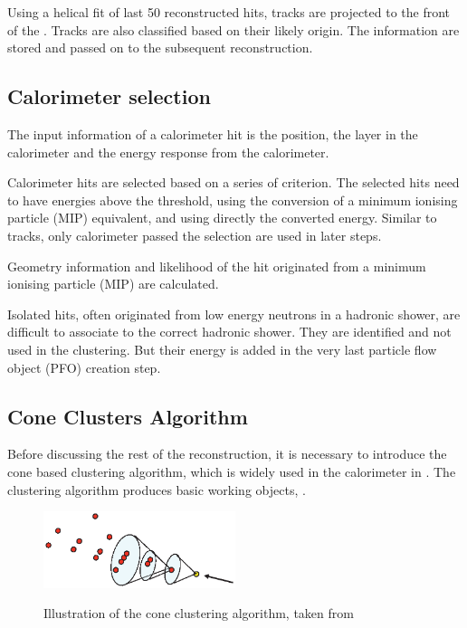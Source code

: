 Using a helical fit of last 50 reconstructed hits, tracks are projected to the front of the \ECAL. Tracks are also classified based on their likely origin. The information are stored and passed on to the subsequent reconstruction.

\subsection{Calorimeter selection}

The input information of a calorimeter hit is the position, the layer in the calorimeter and the energy response from the calorimeter.

Calorimeter hits are selected based on a series of criterion. The selected hits need to have energies above the threshold, using the conversion of a minimum ionising particle (MIP) equivalent, and using directly the converted energy. Similar to tracks, only calorimeter passed the selection are used in later steps.

Geometry information and likelihood of the hit originated from a minimum ionising particle (MIP) are calculated.

Isolated hits, often originated from low energy neutrons in a hadronic shower, are difficult to associate to the correct hadronic shower. They are identified and not used in the clustering. But their energy is added in the very last particle flow object (PFO) creation step.

\subsection{Cone Clusters Algorithm}
\label{sec:pandoraConeCluster}
Before discussing the rest of the \pandora reconstruction, it is necessary to introduce the cone based clustering algorithm, which is widely used in the calorimeter in \pandora. The clustering algorithm produces basic working objects, \clusters.


\begin{figure}[tbph]
\centering
{\includegraphics[width=0.5\textwidth]{pandora/coneClustering}}%

\caption{Illustration of the cone clustering algorithm, taken from \cite{Marshall:pandoraLC}}
\label{fig:pandoraConeClustering}
\end{figure}


